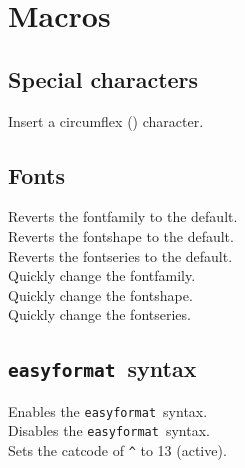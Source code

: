 \documentclass[a4paper, 11pt]{article}
\def\easyformat{\texttt{easyformat}}
\begin{document}
	
	\section{Macros}
	\subsection{Special characters}
	\noindent{}
	Insert a circumflex (\cir) character.

	\subsection{Fonts}
	\noindent{}
	Reverts the fontfamily to the default.\\

	\noindent{}
	Reverts the fontshape to the default.\\

	\noindent{}
	Reverts the fontseries to the default.\\

	\noindent{}
	Quickly change the fontfamily.\\

	\noindent{}
	Quickly change the fontshape.\\

	\noindent{}
	Quickly change the fontseries.
	
	\subsection{\easyformat\ syntax}
	\noindent{}
	Enables the \easyformat\ syntax.\\
	
	\noindent{}
	Disables the \easyformat\ syntax.\\
	
	\noindent{}
	Sets the catcode of \verb|^| to 13 (active).\\
	
\end{document}
